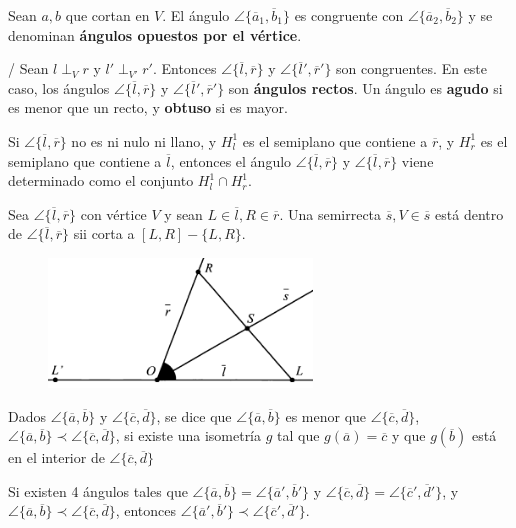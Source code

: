  Sean $a,b$ que cortan en $V$. El ángulo  $\angle \{\overline{a}_1, \overline{b}_1 \}$ es congruente con  $\angle \{\overline{a}_2, \overline{b}_2 \}$ y se denominan \textbf{ángulos opuestos por el vértice}.

/ Sean $l\perp_V r$ y $l'\perp_{V'}r'$. Entonces  $\angle \{\overline{l}, \overline{r} \}$
y $\angle \{\overline{l}', \overline{r}' \}$ son congruentes. En este caso, los ángulos $\angle \{\overline{l}, \overline{r} \}$
y $\angle \{\overline{l}', \overline{r}' \}$ son \textbf{ángulos rectos}.  Un ángulo es \textbf{agudo} si es menor que un recto, y \textbf{obtuso} si es mayor.
	
 Si $\angle \{\overline{l}, \overline{r} \}$ no es ni nulo ni llano, y $H_l^1$ es el semiplano que contiene a $\overline{r}$, y $H^1_r$ es el semiplano que contiene a $\overline{l}$, entonces el ángulo $\angle \{\overline{l}, \overline{r} \}$
y $\angle \{\overline{l}, \overline{r} \}$ viene determinado como el conjunto $H^1_l \cap H^1_r$.


 Sea   $\angle \{\overline{l}, \overline{r} \}$ con vértice $V$ y sean $L \in \overline{l}, R \in \overline{r}$. Una semirrecta $\overline{s}, V \in \overline{s}$ está dentro de  $\angle \{\overline{l}, \overline{r} \}$ sii corta a $[L,R] - \{L,R\}$.

\begin{figure}[H]
	\centering
	\includegraphics[width=7cm]{figuras/4-18.png}
	\vspace{-1em}
\end{figure}

 Dados   $\angle \{\overline{a}, \overline{b} \}$ y  $\angle \{\overline{c}, \overline{d} \}$, se dice que $\angle \{\overline{a}, \overline{b} \}$ es menor que $\angle \{\overline{c}, \overline{d} \}$, $\angle \{\overline{a}, \overline{b} \} \prec \angle \{\overline{c}, \overline{d} \}$, si existe una isometría $g$ tal que $g(\overline{a}) = \overline{c}$ y que $g(\overline{b})$ está en el interior de  $\angle \{\overline{c}, \overline{d} \}$

 Si existen 4 ángulos tales que
 $\angle\{\overline{a}, \overline{b} \} = \angle\{\overline{a}', \overline{b}' \}$ y $\angle\{\overline{c}, \overline{d} \} = \angle\{\overline{c}', \overline{d}' \}$,  y $\angle\{\overline{a}, \overline{b} \} \prec \angle \{\overline{c}, \overline{d} \}$, entonces
$\angle\{\overline{a}', \overline{b}' \} \prec \angle \{\overline{c}', \overline{d}' \}$.

